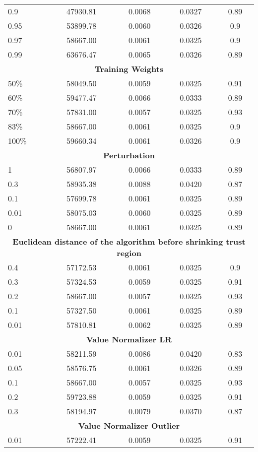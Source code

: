 \begin{longtable}[H]{lcccc}
0.9 & 47930.81 & 0.0068 & 0.0327 & 0.89 \\
0.95 & 53899.78 & 0.0060 & 0.0326 & 0.9 \\
0.97 & 58667.00 & 0.0061 & 0.0325 & 0.9 \\
0.99 & 63676.47 & 0.0065 & 0.0326 & 0.89 \\
\midrule
\multicolumn{5}{c}{\textbf{Training Weights}} \\
50\% & 58049.50 & 0.0059 & 0.0325 & 0.91 \\
60\% & 59477.47 & 0.0066 & 0.0333 & 0.89 \\
70\% & 57831.00 & 0.0057 & 0.0325 & 0.93 \\
83\% & 58667.00 & 0.0061 & 0.0325 & 0.9 \\
100\% & 59660.34 & 0.0061 & 0.0326 & 0.9 \\
\midrule
\multicolumn{5}{c}{\textbf{Perturbation}} \\
1 & 56807.97 & 0.0066 & 0.0333 & 0.89 \\
0.3 & 58935.38 & 0.0088 & 0.0420 & 0.87 \\
0.1 & 57699.78 & 0.0061 & 0.0325 & 0.89 \\
0.01 & 58075.03 & 0.0060 & 0.0325 & 0.89 \\
0 & 58667.00 & 0.0061 & 0.0325 & 0.89 \\
\midrule
\multicolumn{5}{c}{\textbf{Euclidean distance of the algorithm before shrinking trust region}} \\
0.4 & 57172.53 & 0.0061 & 0.0325 & 0.9 \\
0.3 & 57324.53 & 0.0059 & 0.0325 & 0.91 \\
0.2 & 58667.00 & 0.0057 & 0.0325 & 0.93 \\
0.1 & 57327.50 & 0.0061 & 0.0325 & 0.89 \\
0.01 & 57810.81 & 0.0062 & 0.0325 & 0.89 \\
\midrule
\multicolumn{5}{c}{\textbf{Value Normalizer LR}} \\
0.01 & 58211.59 & 0.0086 & 0.0420 & 0.83 \\
0.05 & 58576.75 & 0.0061 & 0.0326 & 0.89 \\
0.1 & 58667.00 & 0.0057 & 0.0325 & 0.93 \\
0.2 & 59723.88 & 0.0059 & 0.0325 & 0.91 \\
0.3 & 58194.97 & 0.0079 & 0.0370 & 0.87 \\
\midrule
\multicolumn{5}{c}{\textbf{Value Normalizer Outlier}} \\
0.01 & 57222.41 & 0.0059 & 0.0325 & 0.91 \\

\end{longtable}
